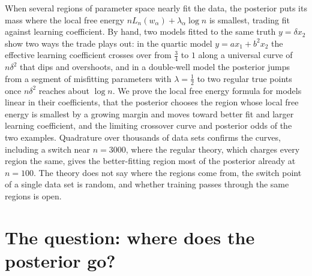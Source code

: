 \newcommand{\phasessig}{\operatorname{sig}}        %
\newcommand{\phasesLpop}{\Lambda_{\mathrm{pop}}}   %
\newcommand{\phasesLdat}{\Lambda_{\mathrm{data}}}  %
\newcommand{\phasesasinh}{\operatorname{arsinh}}

\begin{refsection}

\begin{chaptersummary}
When several regions of parameter space nearly fit the data, the posterior puts its mass where the local free energy $nL_n(w_\alpha)+\lambda_\alpha\log n$ is smallest, trading fit against learning coefficient. By hand, two models fitted to the same truth $y=\delta x_2$ show two ways the trade plays out: in the quartic model $y=ax_1+b^2x_2$ the effective learning coefficient crosses over from $\frac34$ to $1$ along a universal curve of $n\delta^2$ that dips and overshoots, and in a double-well model the posterior jumps from a segment of misfitting parameters with $\lambda=\frac12$ to two regular true points once $n\delta^2$ reaches about $\log n$. We prove the local free energy formula for models linear in their coefficients, that the posterior chooses the region whose local free energy is smallest by a growing margin and moves toward better fit and larger learning coefficient, and the limiting crossover curve and posterior odds of the two examples. Quadrature over thousands of data sets confirms the curves, including a switch near $n=3000$, where the regular theory, which charges every region the same, gives the better-fitting region most of the posterior already at $n=100$. The theory does not say where the regions come from, the switch point of a single data set is random, and whether training passes through the same regions is open.
\end{chaptersummary}

\section{The question: where does the posterior go?}\label{sec:phases:question}


\end{refsection}
